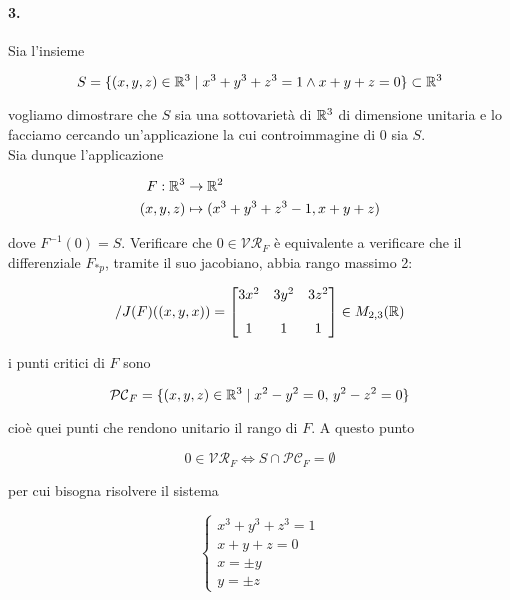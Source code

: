 \paragraph{3.}

Sia l'insieme

\begin{equation}
	S = \{ (x,y,z) \in \mathbb{R}^{3} \mid x^{3} + y^{3} + z^{3} = 1 \wedge x+y+z=0 \} \subset \mathbb{R}^{3}
\end{equation}

vogliamo dimostrare che $ S $ sia una sottovarietà di $ \mathbb{R}^{3} $ di dimensione unitaria e lo facciamo cercando un'applicazione la cui controimmagine di 0 sia $ S $.\\
Sia dunque l'applicazione

\begin{align}
	\begin{split}
		F : \mathbb{R}^{3} &\to \mathbb{R}^{2}\\
		(x,y,z) &\mapsto (x^{3}+y^{3}+z^{3}-1, x+y+z)
	\end{split}
\end{align}

dove $ F^{-1}(0) = S $. Verificare che $ 0 \in \mathcal{VR}_{F} $ è equivalente a verificare che il differenziale $ F_{*p} $, tramite il suo jacobiano, abbia rango massimo 2:

\begin{equation}/
	J(F)((x,y,x)) = \begin{bmatrix} 3x^{2} & 3y^{2} & 3z^{2} \\\\ 1 & 1 & 1 \end{bmatrix} \in M_{2,3}(\mathbb{R})
\end{equation}

i punti critici di $ F $ sono

\begin{equation}
	\mathcal{PC}_{F} = \{ (x,y,z) \in \mathbb{R}^{3} \mid x^{2}-y^{2}=0 , \, y^{2}-z^{2}=0 \}
\end{equation}

cioè quei punti che rendono unitario il rango di $ F $. A questo punto

\begin{equation}
	0 \in \mathcal{VR}_{F} \iff S \cap \mathcal{PC}_{F} = \emptyset
\end{equation}

per cui bisogna risolvere il sistema

\begin{equation}
	\begin{cases}
		x^{3} + y^{3} + z^{3} = 1\\
		x+y+z=0\\
		x = \pm y\\
		y = \pm z
	\end{cases}
\end{equation}

